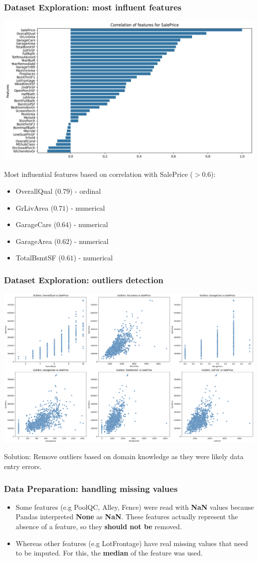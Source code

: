 \documentclass{beamer}
\begin{document}
\begin{frame}
\frametitle{Dataset Exploration: most influent features}
\centering
    \includegraphics[width=.8\textwidth]{../challenge/main_files/main_17_0.png}

Most influential features based on correlation with SalePrice ($> 0.6$):
\begin{itemize}
    \item OverallQual ($0.79$) - ordinal
    \item GrLivArea ($0.71$) - numerical
    \item GarageCars ($0.64$) - numerical
    \item GarageArea ($0.62$) - numerical
    \item TotalBsmtSF ($0.61$) - numerical
\end{itemize}
\end{frame}

\begin{frame}
\frametitle{Dataset Exploration: outliers detection}
\centering
    \includegraphics[width=.8\textwidth]{../challenge/main_files/main_92_0.png}

Solution: Remove outliers based on domain knowledge as they were likely data entry errors.
\end{frame}

\begin{frame}
\frametitle{Data Preparation: handling missing values}

\begin{itemize}
    \item Some features (e.g PoolQC, Alley, Fence) were read with \textbf{NaN} values because Pandas interpreted \textbf{None} as \textbf{NaN}. These features actually represent the absence of a feature, so they \textbf{should not be} removed.
    \item Whereas other features (e.g LotFrontage) have real missing values that need to be imputed. For this, the \textbf{median} of the feature was used.
\end{itemize}
\end{frame}
\end{document}
